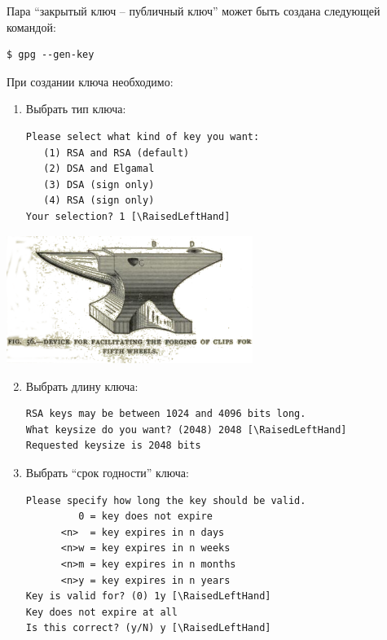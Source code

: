 \documentclass[presentation]{beamer}
\newcommand{\RaisedLeftHand}{%
  \raisebox{-.50em}{\Large\HandLeft}
}
\begin{document}
\begin{frame}[fragile]{}
  Пара ``закрытый ключ -- публичный ключ'' может быть создана
  следующей командой:
\begin{verbatim}
$ gpg --gen-key
\end{verbatim}
  При создании ключа необходимо:
  \begin{enumerate}
  \item Выбрать тип ключа:
    \small
\begin{Verbatim}[commandchars=\\\[\]]
Please select what kind of key you want:
   (1) RSA and RSA (default)
   (2) DSA and Elgamal
   (3) DSA (sign only)
   (4) RSA (sign only)
Your selection? 1 [\RaisedLeftHand]
\end{Verbatim}
\normalsize
  \end{enumerate}
  \vspace*{-3\baselineskip}
  \hspace*{10\baselineskip}
  \includegraphics[width=0.6\textwidth]{anvil-00}
\end{frame}

\begin{frame}[fragile]{}
  \begin{enumerate}
    \setcounter{enumi}{1}
  \item Выбрать длину ключа:
    \small
\begin{Verbatim}[commandchars=\\\[\]]
RSA keys may be between 1024 and 4096 bits long.
What keysize do you want? (2048) 2048 [\RaisedLeftHand]
Requested keysize is 2048 bits
\end{Verbatim}
\normalsize
\item Выбрать ``срок годности'' ключа:
  \small
\begin{Verbatim}[commandchars=\\\[\]]
Please specify how long the key should be valid.
         0 = key does not expire
      <n>  = key expires in n days
      <n>w = key expires in n weeks
      <n>m = key expires in n months
      <n>y = key expires in n years
Key is valid for? (0) 1y [\RaisedLeftHand]
Key does not expire at all
Is this correct? (y/N) y [\RaisedLeftHand]
\end{Verbatim}
\normalsize
    \end{enumerate}
\end{frame}
\end{document}
